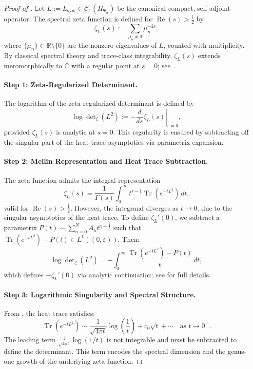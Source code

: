 \begin{proof}[Proof of ]
Let \( L := L_{\mathrm{sym}} \in \mathcal{C}_1(H_{\Psi_\alpha}) \) be the canonical compact, self-adjoint operator. The spectral zeta function is defined for \( \operatorname{Re}(s) > \tfrac{1}{2} \) by
\[
\zeta_L(s) := \sum_{\mu_n \neq 0} \mu_n^{-2s},
\]
where \( \{ \mu_n \} \subset \mathbb{R} \setminus \{0\} \) are the nonzero eigenvalues of \( L \), counted with multiplicity. By classical spectral theory and trace-class integrability, \( \zeta_L(s) \) extends meromorphically to \( \mathbb{C} \) with a regular point at \( s = 0 \); see~\cite[Ch.~3]{Simon2005TraceIdeals}.

\paragraph{Step 1: Zeta-Regularized Determinant.}
The logarithm of the zeta-regularized determinant is defined by
\[
\log \det\nolimits_\zeta(L^2) := -\left. \frac{d}{ds} \zeta_L(s) \right|_{s=0},
\]
provided \( \zeta_L(s) \) is analytic at \( s = 0 \). This regularity is ensured by subtracting off the singular part of the heat trace asymptotics via parametrix expansion.

\paragraph{Step 2: Mellin Representation and Heat Trace Subtraction.}
The zeta function admits the integral representation
\[
\zeta_L(s) = \frac{1}{\Gamma(s)} \int_0^\infty t^{s - 1} \operatorname{Tr}(e^{-t L^2}) \, dt,
\]
valid for \( \operatorname{Re}(s) > \tfrac{1}{2} \). However, the integrand diverges as \( t \to 0 \), due to the singular asymptotics of the heat trace. To define \( \zeta_L'(0) \), we subtract a parametrix \( P(t) \sim \sum_{n=0}^{N} A_n t^{n - \frac{1}{2}} \) such that \( \operatorname{Tr}(e^{-t L^2}) - P(t) \in L^1((0,\varepsilon)) \). Then:
\[
\log \det\nolimits_\zeta(L^2)
= -\int_0^\infty \frac{\operatorname{Tr}(e^{-t L^2}) - P(t)}{t} \, dt,
\]
which defines \( -\zeta_L'(0) \) via analytic continuation; see  for full details.

\paragraph{Step 3: Logarithmic Singularity and Spectral Structure.}
From , the heat trace satisfies:
\[
\operatorname{Tr}(e^{-t L^2}) \sim \frac{1}{\sqrt{4\pi t}} \log\left( \frac{1}{t} \right) + c_0 \sqrt{t} + \cdots \quad \text{as } t \to 0^+.
\]
The leading term \( \frac{1}{\sqrt{4\pi t}} \log(1/t) \) is not integrable and must be subtracted to define the determinant. This term encodes the spectral dimension and the genus-one growth of the underlying zeta function.


\end{proof}
